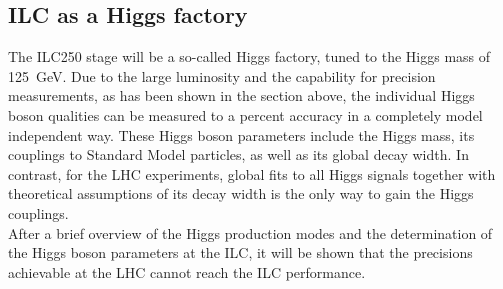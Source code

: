 \subsection{ILC as a Higgs factory}
The ILC250 stage will be a so-called Higgs factory, tuned to the Higgs mass of \SI{125}{\GeV}.
Due to the large luminosity and the capability for precision measurements, as has been shown in the section above, the individual Higgs boson qualities can be measured to a percent accuracy in a completely model independent way.
These Higgs boson parameters include the Higgs mass, its couplings to Standard Model particles, as well as its global decay width.
In contrast, for the LHC experiments, global fits to all Higgs signals together with theoretical assumptions of its decay width is the only way to gain the Higgs couplings.
\\After a brief overview of the Higgs production modes and the determination of the Higgs boson parameters at the ILC, it will be shown that the precisions achievable at the LHC cannot reach the ILC performance.

